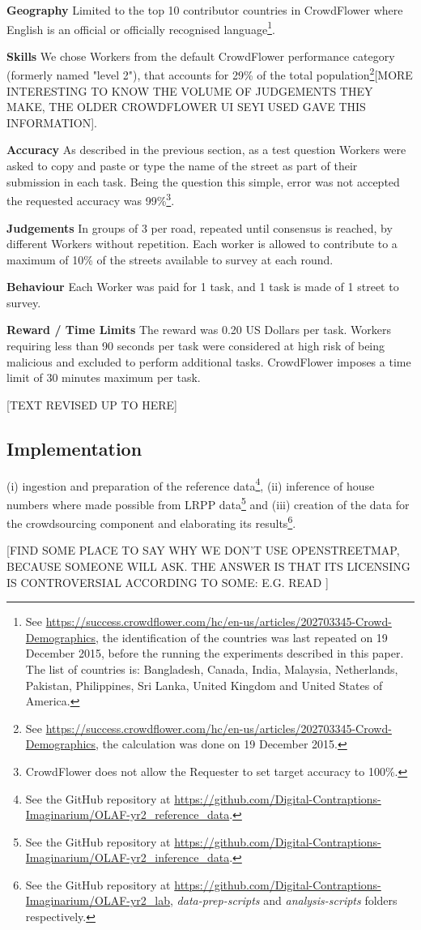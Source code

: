 \textbf{Geography} Limited to the top 10 contributor countries in CrowdFlower where English is an official or officially recognised language\footnote{See \url{https://success.crowdflower.com/hc/en-us/articles/202703345-Crowd-Demographics}, the identification of the countries was last repeated on 19 December 2015, before the running the experiments described in this paper. The list of countries is: Bangladesh, Canada, India, Malaysia, Netherlands, Pakistan, Philippines, Sri Lanka, United Kingdom and United States of America.}.

\textbf{Skills} We chose Workers from the default CrowdFlower performance category (formerly named "level 2"), that accounts for 29\% of the total population\footnote{See \url{https://success.crowdflower.com/hc/en-us/articles/202703345-Crowd-Demographics}, the calculation was done on 19 December 2015.}[MORE INTERESTING TO KNOW THE VOLUME OF JUDGEMENTS THEY MAKE, THE OLDER CROWDFLOWER UI SEYI USED GAVE THIS INFORMATION].

\textbf{Accuracy} As described in the previous section, as a test question Workers were asked to copy and paste or type the name of the street as part of their submission in each task. Being the question this simple, error was not accepted the requested accuracy was 99\%\footnote{CrowdFlower does not allow the Requester to set target accuracy to 100\%.}.

\textbf{Judgements} In groups of 3 per road, repeated until consensus is reached, by different Workers without repetition. Each worker is allowed to contribute to a maximum of 10\% of the streets available to survey at each round.

\textbf{Behaviour} Each Worker was paid for 1 task, and 1 task is made of 1 street to survey.

\textbf{Reward / Time Limits} The reward was 0.20 US Dollars per task. Workers requiring less than 90 seconds per task were considered at high risk of being malicious and excluded to perform additional tasks. CrowdFlower imposes a time limit of 30 minutes maximum per task.

[TEXT REVISED UP TO HERE]

\subsection{Implementation}

(i) ingestion and preparation of the reference data\footnote{See the GitHub repository at \url{https://github.com/Digital-Contraptions-Imaginarium/OLAF-yr2_reference_data}.}, (ii) inference of house numbers where made possible from LRPP data\footnote{See the GitHub repository at \url{https://github.com/Digital-Contraptions-Imaginarium/OLAF-yr2_inference_data}.} and (iii) creation of the data for the crowdsourcing component and elaborating its results\footnote{See the GitHub repository at \url{https://github.com/Digital-Contraptions-Imaginarium/OLAF-yr2_lab}, {\it data-prep-scripts} and {\it analysis-scripts} folders respectively.}. 

[FIND SOME PLACE TO SAY WHY WE DON'T USE OPENSTREETMAP, BECAUSE SOMEONE WILL ASK. THE ANSWER IS THAT ITS LICENSING IS CONTROVERSIAL ACCORDING TO SOME: E.G. READ \cite{CentreforSpatialLawandPolicy:2014tx}]
    

